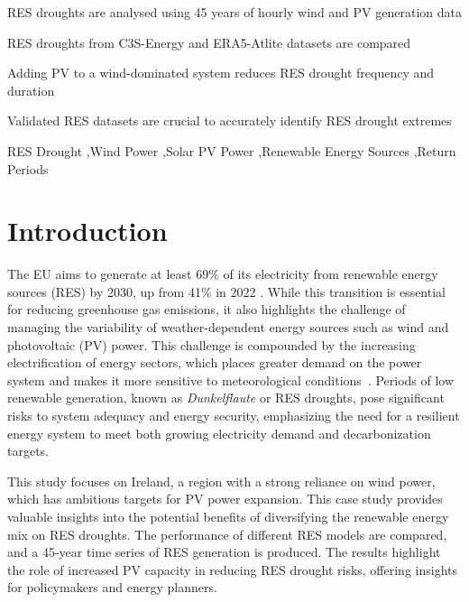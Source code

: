 \documentclass[preprint, 12pt]{elsarticle}
\begin{document}
\begin{frontmatter}
\begin{highlights}
\item RES droughts are analysed using 45 years of hourly wind and PV generation data

\item RES droughts from C3S-Energy and ERA5-Atlite datasets are compared

\item Adding PV to a wind-dominated system reduces RES drought frequency and duration

\item Validated RES datasets are crucial to accurately identify RES drought extremes

\end{highlights}

\begin{keyword}
RES Drought \sep Wind Power \sep Solar PV Power \sep Renewable Energy Sources \sep Return Periods

\end{keyword}

\end{frontmatter}

\linenumbers

\section{Introduction}
\label{sec:Intro}

The EU aims to generate at least 69\% of its electricity from renewable energy sources (RES) by 2030, up from 41\% in 2022 \citep{eurostat2023share}. While this transition is essential for reducing greenhouse gas emissions, it also highlights the challenge of managing the variability of weather-dependent energy sources such as wind and photovoltaic (PV) power. This challenge is compounded by the increasing electrification of energy sectors, which places greater demand on the power system and makes it more sensitive to meteorological conditions~\citep{bloomfield2016, bloomfield2021, vanderwiel2019drought}. Periods of low renewable generation, known as \textit{Dunkelflaute} or RES droughts, pose significant risks to system adequacy and energy security, emphasizing the need for a resilient energy system to meet both growing electricity demand and decarbonization targets.

This study focuses on Ireland, a region with a strong reliance on wind power, which has ambitious targets for PV power expansion. This case study provides valuable insights into the potential benefits of diversifying the renewable energy mix on RES droughts. The performance of different RES models are compared, and a 45-year time series of RES generation is produced. The results highlight the role of increased PV capacity in reducing RES drought risks, offering insights for policymakers and energy planners.
\end{document}
